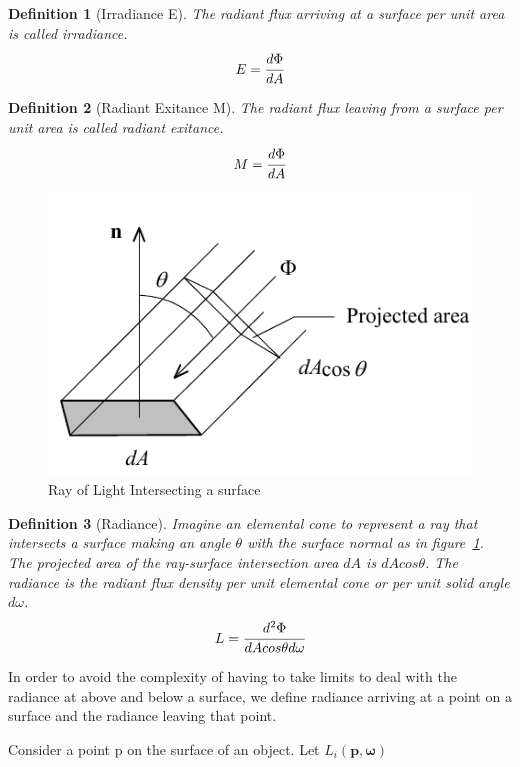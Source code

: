\documentclass[a4paper, 12pt]{article}
\newtheorem{definition}{Definition}
\begin{document}
\begin{definition}[Irradiance E]
	The radiant flux arriving at a surface per unit area 
	is called irradiance. 
	$$
		E = \cfrac{d\Phi}{dA}
	$$
\end{definition}

\begin{definition}[Radiant Exitance M]
	The radiant flux leaving from a surface per unit area 
	is called radiant exitance. 
	$$
		M =  \cfrac{d\Phi}{dA}
	$$
\end{definition}
\begin{center}
\begin{figure}
	\includegraphics[width=0.8\linewidth, scale=0.6]{raynormal.png}
	\centering
	\caption{Ray of Light Intersecting a surface}
	\label{figure:rayandnormal}
\end{figure}
\end{center}

\begin{definition}[Radiance]
	Imagine an elemental cone to represent a 
	ray that intersects a surface making an 
	angle $\theta$ with the surface normal as in figure~\ref{figure:rayandnormal}.
	The projected area of the ray-surface intersection area $dA$
	is $dAcos\theta$. The radiance is the radiant flux 
	density per unit elemental cone or per unit solid 
	angle $d\omega$. 
	$$
		L = \cfrac{d^{2} \Phi}{dA cos\theta d\omega}
	$$
\end{definition}
In order to avoid the complexity of having to take limits to 
deal with the radiance at above and below a surface, we define radiance 
arriving at a point on a surface and the radiance leaving that point. 

Consider a point p on the surface of an object. Let $L_{i}(\bm{p}, \bm{\omega})$


\newpage
\printbibliography
\end{document}
